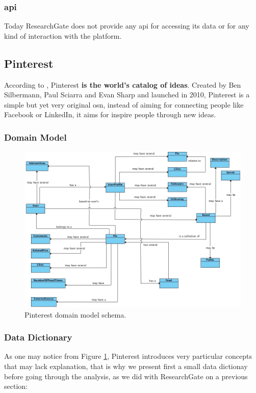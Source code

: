 \subsubsection*{\gls{api}}
Today ResearchGate does not provide any \gls{api} for accessing its data or for any kind of interaction with the platform.

\subsection{Pinterest}
According to \cite{pintabout}, Pinterest \textbf{is the world's catalog of ideas}. Created by Ben Silbermann, Paul Sciarra and Evan Sharp and launched in 2010, Pinterest is a simple but yet very original \gls{osn}, instead of aiming for connecting people like Facebook or LinkedIn, it aims for inspire people through new ideas.

\clearpage

\subsubsection*{Domain Model}

\begin{figure}[h!]
  \hspace*{-1in}
  \includegraphics[width=1.20\textwidth]{img/pinterest-domain-model.jpg}
\caption{\label{img:pintdomain} Pinterest domain model schema.}
\end{figure}

\subsubsection*{Data Dictionary}
As one may notice from Figure \ref{img:pintdomain}, Pinterest introduces very particular concepts that may lack explanation, that is why we present first a small data dictionay before going through the analysis, as we did with ResearchGate on a previous section:


